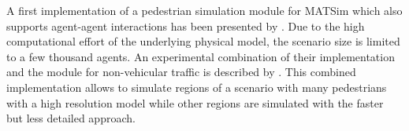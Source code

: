 A first implementation of a pedestrian simulation module for MATSim which also supports agent-agent interactions has been presented by \citet{LaemmelPlaue_PED_2012}. Due to the high computational effort of the underlying physical model, the scenario size is limited to a few thousand agents. An experimental combination of their implementation and the module for non-vehicular traffic is described by \citet{DoblerLaemmel_PED_2012}. This combined implementation allows to simulate regions of a scenario with many pedestrians with a high resolution model while other regions are simulated with the faster but less detailed approach.

